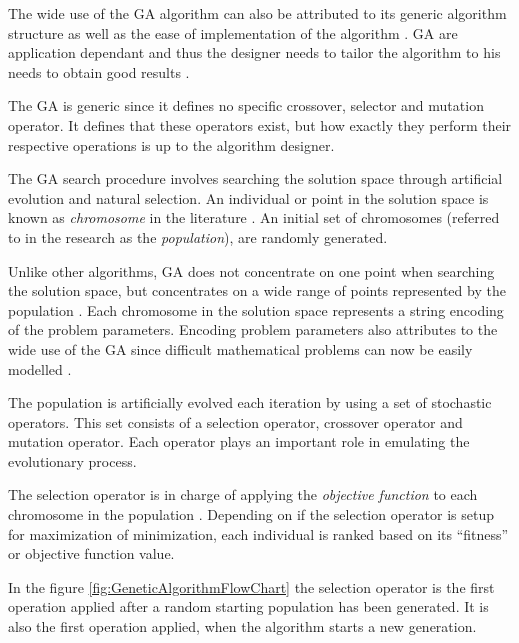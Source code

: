The wide use of the GA algorithm can also be attributed to its generic algorithm structure as well as the ease of implementation of the algorithm \cite{FamilyGA,AdaptiveSAGA}. GA are application dependant and thus the designer needs to tailor the algorithm to his needs to obtain good results \cite{AcceleratingGA}.

The GA is generic since it defines no specific crossover, selector and mutation operator. It defines that these operators exist, but how exactly they perform their respective operations is up to the algorithm designer.

The GA search procedure involves searching the solution space through artificial evolution and natural selection\cite{FamilyGA,MultiPopGA,HybridIntelliGA}. An individual or point in the solution space is known as \emph{chromosome} in the literature \cite{HumanPassiveGA}. An initial set of chromosomes (referred to in the research as the \emph{population}), are randomly generated\cite{FamilyGA,HybridIntelliGA,AcceleratingGA,MultiPopGA}. 

Unlike other algorithms, GA does not concentrate on one point when searching the solution space, but concentrates on a wide range of points represented by the population \cite{DistributedHierarchicalGA,FamilyGA,HybridIntelliGA}\label{GASearchPoints}. Each chromosome in the solution space represents a string encoding of the problem parameters\cite{FamilyGA}. Encoding problem parameters also attributes to the wide use of the GA since difficult mathematical problems can now be easily modelled \cite{AcceleratingGA}.

The population is artificially evolved each iteration by using a set of stochastic operators\cite{SelfAdaptiveGA}. This set consists of a selection operator, crossover operator and mutation operator\cite{SelfAdaptiveGA,MultiPopGA}. Each operator plays an important role in emulating the evolutionary process. 

The selection operator is in charge of applying the \emph{objective function} to each chromosome in the population \cite{AdaptiveSAGA,HumanPassiveGA}. Depending on if the selection operator is setup for maximization of minimization, each individual is ranked based on its ``fitness'' or objective function value.

In the figure \ref{fig:GeneticAlgorithmFlowChart} the selection operator is the first operation applied after a random starting population has been generated. It is also the first operation applied, when the algorithm starts a new generation.

